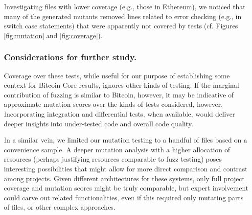 %

Investigating files with lower coverage (e.g., those in Ethereum), we noticed
that many of the generated mutants removed lines related to error checking
(e.g., in switch case statements) that were apparently not covered by tests (cf.
Figures \ref{fig:mutation} and \ref{fig:coverage}).

%

\subsubsection*{Considerations for further study.}

Coverage over these tests, while useful for our purpose of
establishing some context for Bitcoin Core results, ignores
other kinds of testing. If the marginal contribution of fuzzing is
similar to Bitcoin, however, it may be indicative of approximate
mutation scores over the kinds of tests considered, however.
Incorporating integration and differential tests, when available, would deliver deeper insights into under-tested code and overall code quality.

In a similar vein, we limited our mutation testing to a handful of files based
on a convenience sample. A deeper mutation analysis with a higher allocation of
resources (perhaps justifying resources comparable to fuzz testing) poses interesting
possibilities that might allow for more direct comparison and contrast among
projects.  Given different architectures for these systems, only full
project coverage and mutation scores might be truly comparable, but
expert involvement could carve out related functionalities, even if
this required only mutating parts of files, or other complex approaches.


